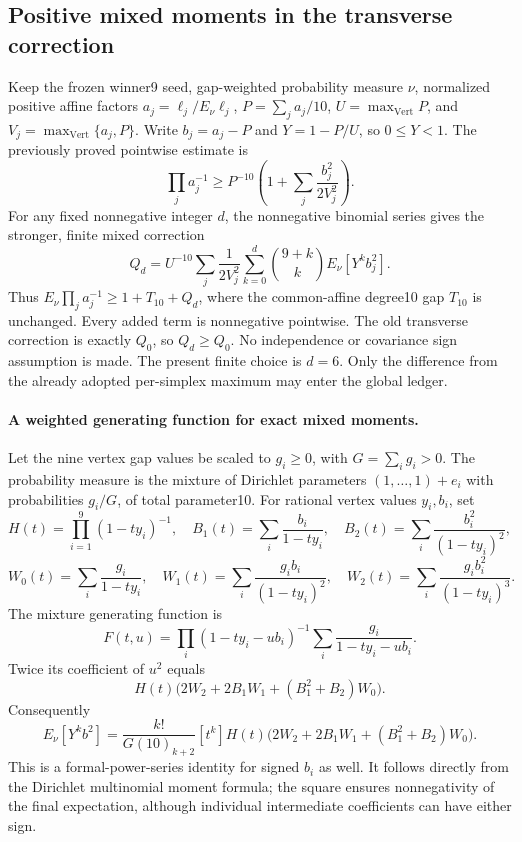 \subsection{Positive mixed moments in the transverse correction}
\label{sec:eighth-joint-transverse-mixed-20261009}

Keep the frozen winner9 seed, gap-weighted probability measure $\nu$,
normalized positive affine factors $a_j=\ell_j/E_\nu\ell_j$,
$P=\sum_ja_j/10$, $U=\max_{\mathrm{Vert}}P$, and
$V_j=\max_{\mathrm{Vert}}\{a_j,P\}$. Write $b_j=a_j-P$ and
$Y=1-P/U$, so $0\le Y<1$. The previously proved pointwise estimate is
\[
 \prod_ja_j^{-1}\ge P^{-10}
              \left(1+\sum_j\frac{b_j^2}{2V_j^2}\right).
\]
For any fixed nonnegative integer $d$, the nonnegative binomial series
gives the stronger, finite mixed correction
\[
 Q_d=U^{-10}\sum_j\frac1{2V_j^2}
       \sum_{k=0}^d {9+k\choose k}E_\nu[Y^k b_j^2].
\]
Thus $E_\nu\prod_ja_j^{-1}\ge1+T_{10}+Q_d$, where the common-affine
degree10 gap $T_{10}$ is unchanged. Every added term is nonnegative
pointwise. The old transverse correction is exactly $Q_0$, so
$Q_d\ge Q_0$. No independence or covariance sign assumption is made.
The present finite choice is $d=6$. Only the difference from the
already adopted per-simplex maximum may enter the global ledger.

\paragraph{A weighted generating function for exact mixed moments.}
Let the nine vertex gap values be scaled to $g_i\ge0$, with $G=\sum_i g_i>0$.
The probability measure is the mixture of Dirichlet parameters
$(1,\ldots,1)+e_i$ with probabilities $g_i/G$, of total parameter10.
For rational vertex values $y_i,b_i$, set
\[
 H(t)=\prod_{i=1}^9(1-ty_i)^{-1},\quad
 B_1(t)=\sum_i\frac{b_i}{1-ty_i},\quad
 B_2(t)=\sum_i\frac{b_i^2}{(1-ty_i)^2},
\]
\[
 W_0(t)=\sum_i\frac{g_i}{1-ty_i},\quad
 W_1(t)=\sum_i\frac{g_i b_i}{(1-ty_i)^2},\quad
 W_2(t)=\sum_i\frac{g_i b_i^2}{(1-ty_i)^3}.
\]
The mixture generating function is
\[
 F(t,u)=\prod_i(1-ty_i-ub_i)^{-1}
                  \sum_i\frac{g_i}{1-ty_i-ub_i}.
\]
Twice its coefficient of $u^2$ equals
\[
 H(t)\bigl(2W_2+2B_1W_1+(B_1^2+B_2)W_0\bigr).
\]
Consequently
\[
 E_\nu[Y^k b^2]=\frac{k!}{G(10)_{k+2}}
 [t^k]H(t)\bigl(2W_2+2B_1W_1+(B_1^2+B_2)W_0\bigr).
 \tag{M}
\]
This is a formal-power-series identity for signed $b_i$ as well.
It follows directly from the Dirichlet multinomial moment formula;
the square ensures nonnegativity of the final expectation, although
individual intermediate coefficients can have either sign.

